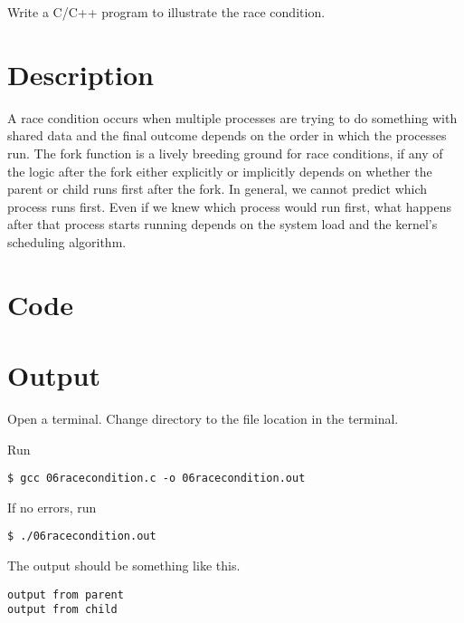 Write a C/C++ program to illustrate the race condition.

\section{Description}

A race condition occurs when multiple processes are trying to do something with shared data and the final outcome depends on the order in which the processes run. The fork function is a lively breeding ground for race conditions, if any of the logic after the fork either explicitly or implicitly depends on whether the parent or child runs first after the fork. In general, we cannot predict which process runs first. Even if we knew which process would run first, what happens after that process starts running depends on the system load and the kernel's scheduling algorithm.

\section{Code}




\section{Output}

Open a terminal. Change directory to the file location in the terminal.

Run
\begin{lstlisting}[style=shell-command]
$ gcc 06racecondition.c -o 06racecondition.out
\end{lstlisting}

If no errors, run
\begin{lstlisting}[style=shell-command]
$ ./06racecondition.out
\end{lstlisting}

The output should be something like this.
\begin{lstlisting}[style=shell-output]
output from parent
output from child
\end{lstlisting}

